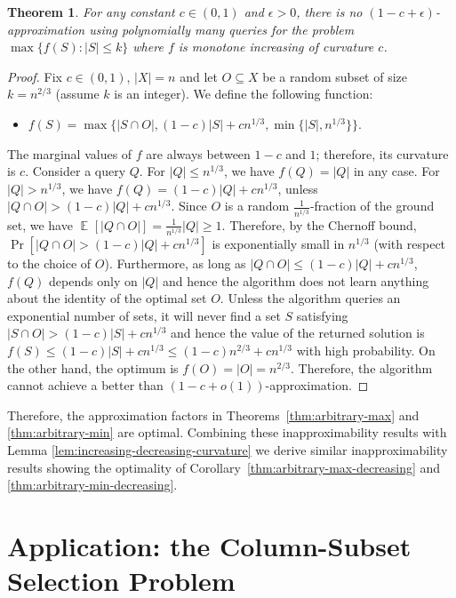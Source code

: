 \documentclass{article}
\DeclareMathOperator*{\expectOp}{\mathbb{E}}
\newcommand{\expect}[2][]{\expectOp_{#1}\left[#2\right]}
\newtheorem{theorem}{Theorem}[section]
\theoremstyle{definition}
\begin{document}
\begin{theorem}
\label{thm:curvature-max-hardness}
For any constant $c \in (0,1)$ and $\epsilon>0$, there is no $(1-c+\epsilon)$-approximation using polynomially many queries for the problem $\max \{f(S): |S| \leq k \}$ where $f$ is monotone increasing of curvature $c$.
\end{theorem}


\begin{proof}
Fix $c \in (0,1)$, $|X| = n$ and let $O \subseteq X$ be a random subset of size $k = n^{2/3}$ (assume $k$ is an integer). We define the following function:
\begin{itemize}
\item $ f(S) = \max \{ |S \cap O|, (1-c) |S| + c n^{1/3}, \min \{|S|, n^{1/3}\} \}$.
\end{itemize}
The marginal values of $f$ are always between $1-c$ and $1$; therefore, its curvature is $c$.
Consider a query $Q$.
For $|Q| \le n^{1/3}$, we have $f(Q) = |Q|$ in any case. For $|Q| > n^{1/3}$, we have $f(Q) = (1-c) |Q| + c n^{1/3}$, unless
$|Q \cap O| > (1-c) |Q| + c n^{1/3}$. Since $O$ is a random $\frac{1}{n^{1/3}}$-fraction of the ground set, we have $\expect{|Q \cap O|} = \frac{1}{n^{1/3}} |Q| \geq 1$.
Therefore, by the Chernoff bound, $\Pr[|Q \cap O| > (1-c) |Q| + c n^{1/3}]$ is exponentially small in $n^{1/3}$ (with respect to the choice of $O$).
Furthermore, as long as $|Q \cap O| \leq (1-c) |Q| + c n^{1/3}$, $f(Q)$ depends only on $|Q|$ and hence the algorithm does not learn anything about the identity of the optimal set $O$. Unless the algorithm queries an exponential number of sets, it will never find a set $S$ satisfying $|S \cap O| > (1-c) |S| + c n^{1/3}$ and hence the value of the returned solution is $f(S) \leq (1-c) |S| + c n^{1/3} \leq (1-c) n^{2/3} + c n^{1/3}$ with high probability. On the other hand, the optimum is $f(O) = |O| = n^{2/3}$. Therefore, the algorithm cannot achieve a better than $(1-c+ o(1))$-approximation.
\end{proof}

Therefore, the approximation factors in Theorems~\ref{thm:arbitrary-max} and \ref{thm:arbitrary-min} are optimal.
Combining these inapproximability results with Lemma \ref{lem:increasing-decreasing-curvature} we derive similar inapproximability results showing the optimality of Corollary~\ref{thm:arbitrary-max-decreasing} and \ref{thm:arbitrary-min-decreasing}.


\section{Application: the Column-Subset Selection Problem}\label{application}
\end{document}
